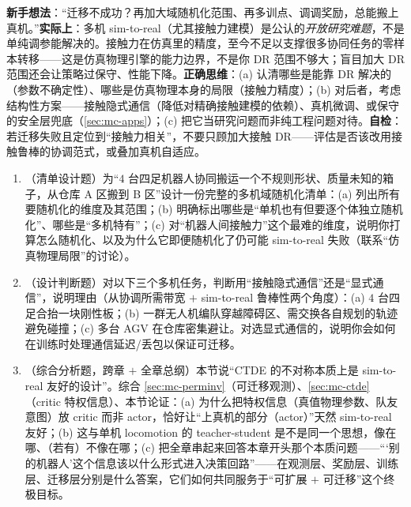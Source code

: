 \begin{pitfall}
\textbf{新手想法}：“迁移不成功？再加大域随机化范围、再多训点、调调奖励，总能搬上真机。”\textbf{实际上}：多机 sim-to-real（尤其接触力建模）是公认的\emph{开放研究难题}，不是单纯调参能解决的。接触力在仿真里的精度，至今不足以支撑很多协同任务的零样本转移——这是仿真物理引擎的能力边界，不是你 DR 范围不够大；盲目加大 DR 范围还会让策略过保守、性能下降。\textbf{正确思维}：(a) 认清哪些是能靠 DR 解决的（参数不确定性）、哪些是仿真物理本身的局限（接触力精度）；(b) 对后者，考虑结构性方案——接触隐式通信（降低对精确接触建模的依赖）、真机微调、或保守的安全层兜底（\cref{sec:mc-apps}）；(c) 把它当研究问题而非纯工程问题对待。\textbf{自检}：若迁移失败且定位到“接触力相关”，不要只顾加大接触 DR——评估是否该改用接触鲁棒的协调范式，或叠加真机自适应。
\end{pitfall}

\begin{practice}
\begin{enumerate}
  \item （清单设计题）为“$4$ 台四足机器人协同搬运一个不规则形状、质量未知的箱子，从仓库 A 区搬到 B 区”设计一份完整的多机域随机化清单：(a) 列出所有要随机化的维度及其范围；(b) 明确标出哪些是“单机也有但要逐个体独立随机化”、哪些是“多机特有”；(c) 对“机器人间接触力”这个最难的维度，说明你打算怎么随机化、以及为什么它即便随机化了仍可能 sim-to-real 失败（联系“仿真物理局限”的讨论）。
  \item （设计判断题）对以下三个多机任务，判断用“接触隐式通信”还是“显式通信”，说明理由（从协调所需带宽 $+$ sim-to-real 鲁棒性两个角度）：(a) $4$ 台四足合抬一块刚性板；(b) 一群无人机编队穿越障碍区、需交换各自规划的轨迹避免碰撞；(c) 多台 AGV 在仓库密集避让。对选显式通信的，说明你会如何在训练时处理通信延迟/丢包以保证可迁移。
  \item （综合分析题，跨章 $+$ 全章总纲）本节说“CTDE 的不对称本质上是 sim-to-real 友好的设计”。综合 \cref{sec:mc-perminv}（可迁移观测）、\cref{sec:mc-ctde}（critic 特权信息）、本节论证：(a) 为什么把特权信息（真值物理参数、队友意图）放 critic 而非 actor，恰好让“上真机的部分（actor）”天然 sim-to-real 友好；(b) 这与单机 locomotion 的 teacher-student 是不是同一个思想，像在哪、（若有）不像在哪；(c) 把全章串起来回答本章开头那个本质问题——“‘别的机器人’这个信息该以什么形式进入决策回路”——在观测层、奖励层、训练层、迁移层分别是什么答案，它们如何共同服务于“可扩展 $+$ 可迁移”这个终极目标。
\end{enumerate}
\end{practice}

